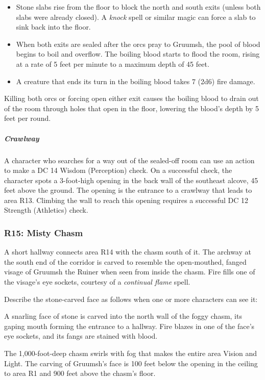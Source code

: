 \documentclass[10pt,a4paper,twoside,fancy,bg=print,twocolumn,openany,nodeprecatedcode]{dndbook}
\begin{document}
\begin{itemize}
\item Stone slabs rise from the floor to block the north and south exits (unless both slabs were already closed). A \textit{knock} spell or similar magic can force a slab to sink back into the floor.
\item When both exits are sealed after the orcs pray to Gruumsh, the pool of blood begins to boil and overflow. The boiling blood starts to flood the room, rising at a rate of 5 feet per minute to a maximum depth of 45 feet.
\item A creature that ends its turn in the boiling blood takes 7 (2d6) fire damage.
\end{itemize}

Killing both orcs or forcing open either exit causes the boiling blood to drain out of the room through holes that open in the floor, lowering the blood's depth by 5 feet per round.

\subparagraph{Crawlway}
A character who searches for a way out of the sealed-off room can use an action to make a DC 14 Wisdom (Perception) check. On a successful check, the character spots a 3-foot-high opening in the back wall of the southeast alcove, 45 feet above the ground. The opening is the entrance to a crawlway that leads to area R13. Climbing the wall to reach this opening requires a successful DC 12 Strength (Athletics) check.

\subsubsection{R15: Misty Chasm}
A short hallway connects area R14 with the chasm south of it. The archway at the south end of the corridor is carved to resemble the open-mouthed, fanged visage of Gruumsh the Ruiner when seen from inside the chasm. Fire fills one of the visage's eye sockets, courtesy of a \textit{continual flame} spell.

Describe the stone-carved face as follows when one or more characters can see it:

\begin{DndReadAloud}{}
A snarling face of stone is carved into the north wall of the foggy chasm, its gaping mouth forming the entrance to a hallway. Fire blazes in one of the face's eye sockets, and its fangs are stained with blood.

\end{DndReadAloud}

The 1,000-foot-deep chasm swirls with fog that makes the entire area Vision and Light. The carving of Gruumsh's face is 100 feet below the opening in the ceiling to area R1 and 900 feet above the chasm's floor.
\end{document}
